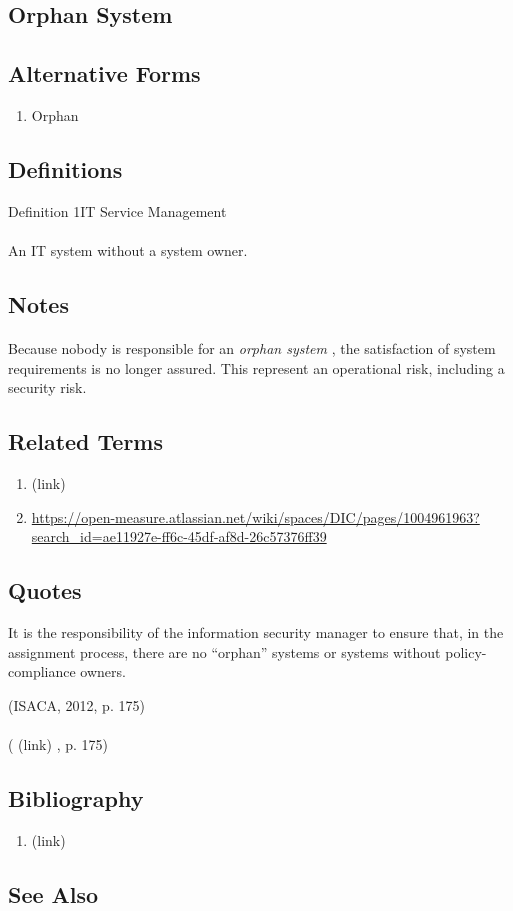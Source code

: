 \newpage \subsection*{Orphan System } \subsection*{Alternative Forms } \begin{enumerate} \item  Orphan  \end{enumerate} \subsection*{Definitions } \begin{DIC_Def}{Definition 1IT Service Management }{} \paragraph{} An IT system without a system owner.  \end{DIC_Def} \subsection*{Notes } \paragraph{} Because nobody is responsible for an  \emph{ orphan system  } , the satisfaction of system requirements is no longer assured. This represent an operational risk, including a security risk.  \subsection*{Related Terms } \begin{enumerate} \item  (link) \href{Orphan (Dictionary Entry) }{ }   \item  \href{None }{https://open-measure.atlassian.net/wiki/spaces/DIC/pages/1004961963?search\_id=ae11927e-ff6c-45df-af8d-26c57376ff39 }   \end{enumerate} \subsection*{Quotes } \begin{DIC_BlockQuote} It is the responsibility of the information security manager to ensure that, in the assignment process, there are no ``orphan'' systems or systems without policy-compliance owners.  \end{DIC_BlockQuote} (ISACA, 2012, p. 175)  \paragraph{} (  (link) \href{ISACA, 2012 }{ } , p. 175)  \subsection*{Bibliography } \begin{enumerate} \item  (link) \href{ISACA, 2012 }{ }   \end{enumerate} \subsection*{See Also } 
